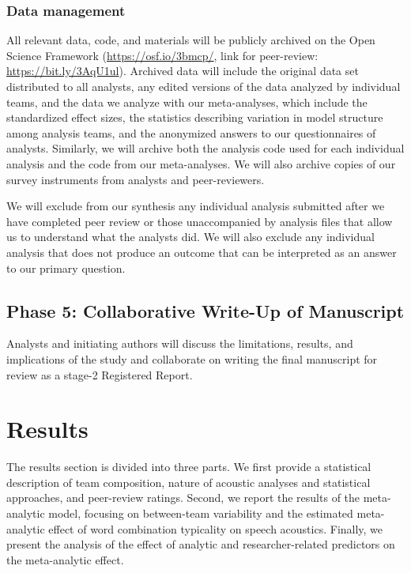\documentclass[Review,times,sageh]{sagej}
\begin{document}
\hypertarget{ana-archive}{%
\subsubsection{Data management}\label{ana-archive}}

All relevant data, code, and materials will be publicly archived on the Open Science Framework (\url{https://osf.io/3bmcp/}, link for peer-review: \url{https://bit.ly/3AqU1ul}).
Archived data will include the original data set distributed to all analysts, any edited versions of the data analyzed by individual teams, and the data we analyze with our meta-analyses, which include the standardized effect sizes, the statistics describing variation in model structure among analysis teams, and the anonymized answers to our questionnaires of analysts.
Similarly, we will archive both the analysis code used for each individual analysis and the code from our meta-analyses.
We will also archive copies of our survey instruments from analysts and peer-reviewers.

We will exclude from our synthesis any individual analysis submitted after we have completed peer review or those unaccompanied by analysis files that allow us to understand what the analysts did.
We will also exclude any individual analysis that does not produce an outcome that can be interpreted as an answer to our primary question.

\hypertarget{phase-5-collaborative-write-up-of-manuscript}{%
\subsection{Phase 5: Collaborative Write-Up of Manuscript}\label{phase-5-collaborative-write-up-of-manuscript}}

Analysts and initiating authors will discuss the limitations, results, and implications of the study and collaborate on writing the final manuscript for review as a stage-2 Registered Report.

\hypertarget{results}{%
\section{Results}\label{results}}

The results section is divided into three parts.
We first provide a statistical description of team composition, nature of acoustic analyses and statistical approaches, and peer-review ratings.
Second, we report the results of the meta-analytic model, focusing on between-team variability and the estimated meta-analytic effect of word combination typicality on speech acoustics.
Finally, we present the analysis of the effect of analytic and researcher-related predictors on the meta-analytic effect.
\end{document}
